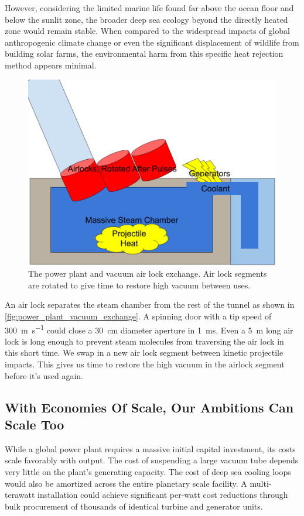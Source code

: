 \documentclass{article}
\begin{document}
However, considering the limited marine life found far above the ocean floor and below the sunlit zone, the broader deep sea ecology beyond the directly heated zone would remain stable. When compared to the widespread impacts of global anthropogenic climate change or even the significant displacement of wildlife from building solar farms, the environmental harm from this specific heat rejection method appears minimal.


\begin{figure}[htpb]
    \centering
    \includegraphics[width=0.5\linewidth]{images/Power Plant Cooling and Generators.png}
    \caption{The power plant and vacuum air lock exchange.  Air lock segments are rotated to give time to restore high vacuum between uses.}
    \label{fig:power_plant_vacuum_exchange}
\end{figure}

An air lock separates the steam chamber from the rest of the tunnel as shown in \autoref{fig:power_plant_vacuum_exchange}.   A spinning door with a tip speed of \SI{300}{\meter\per\second} could close a \SI{30}{\centi\meter} diameter aperture in \SI{1}{\milli\second}.  Even a \SI{5}{\meter} long air lock is long enough to prevent steam molecules from traversing the air lock in this short time.   We swap in a new air lock segment between kinetic projectile impacts.  This gives us time to restore the high vacuum in the airlock segment before it's used again.   


\subsection{With Economies Of Scale, Our Ambitions Can Scale Too}\label{sec:strawway_economics}

While a global power plant requires a massive initial capital investment, its costs scale favorably with output. The cost of suspending a large vacuum tube depends very little on the plant's generating capacity. The cost of deep sea cooling loops would also be amortized across the entire planetary scale facility.  A multi-terawatt installation could achieve significant per-watt cost reductions through bulk procurement of thousands of identical turbine and generator units. 
\end{document}
